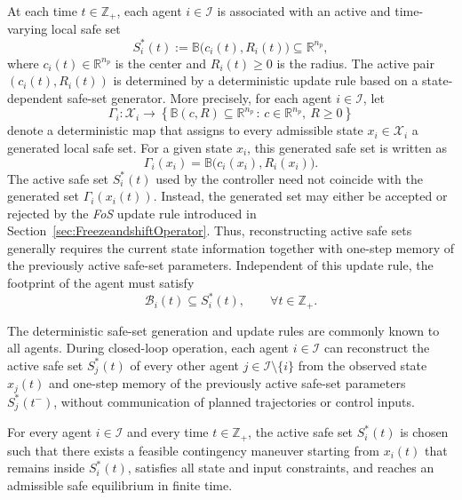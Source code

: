 \documentclass[twocolumn]{autart}
\begin{document}
At each time $t\in\mathbb{Z}_+$, each agent $i\in\mathcal{I}$ is associated with an active and time-varying local safe set
\begin{equation}
S_i^\ast(t) := \mathbb{B}\big(c_i(t),R_i(t)\big)\subseteq\mathbb{R}^{n_p},
\label{eq:local_safe_set}
\end{equation}
where $c_i(t)\in\mathbb{R}^{n_p}$ is the center and $R_i(t)\ge 0$ is the radius.
The active pair \((c_i(t),R_i(t))\) is determined by a deterministic
update rule based on a state-dependent safe-set generator. More
precisely, for each agent \(i\in\mathcal I\), let
\[
\Gamma_i:\mathcal X_i \rightarrow
\left\{
\mathbb B(c,R)\subseteq\mathbb R^{n_p}
\,:\,
c\in\mathbb R^{n_p},\ R\ge 0
\right\}
\]
denote a deterministic map that assigns to every admissible state
\(x_i\in\mathcal X_i\) a generated local safe set. For a given state
\(x_i\), this generated safe set is written as
\[
\Gamma_i(x_i)
=
\mathbb B\big(c_i(x_i),R_i(x_i)\big).
\]
The active safe set \(S_i^\ast(t)\) used by the controller need not
coincide with the generated set \(\Gamma_i(x_i(t))\). Instead, the
generated set may either be accepted or rejected by the \textit{FoS}
update rule introduced in Section~\ref{sec:FreezeandshiftOperator}.
Thus, reconstructing active safe sets generally requires the current
state information together with one-step memory of the previously
active safe-set parameters.
Independent of this update rule, the footprint of the agent must satisfy
\begin{equation}
\mathcal{B}_i(t)\subseteq S_i^\ast(t),\qquad \forall t\in\mathbb{Z}_+.
\label{eq:footprint_containment}
\end{equation}

\begin{assumption}
\label{ass:local_reconstructability}
The deterministic safe-set generation and update rules are commonly
known to all agents. During closed-loop operation, each agent
\(i\in\mathcal I\) can reconstruct the active safe set \(S_j^\ast(t)\)
of every other agent \(j\in\mathcal I\setminus\{i\}\) from the observed
state \(x_j(t)\) and one-step memory of the previously active safe-set
parameters \(S_j^\ast(t^-)\), without communication of planned
trajectories or control inputs.
\end{assumption}

\begin{assumption}
\label{ass:contingency_recoverability}
For every agent $i\in\mathcal{I}$ and every time $t\in\mathbb{Z}_+$, the active safe set $S_i^\ast(t)$ is chosen such that there exists a feasible contingency maneuver starting from $x_i(t)$ that remains inside $S_i^\ast(t)$, satisfies all state and input constraints, and reaches an admissible safe equilibrium in finite time.
\end{assumption}
\end{document}
